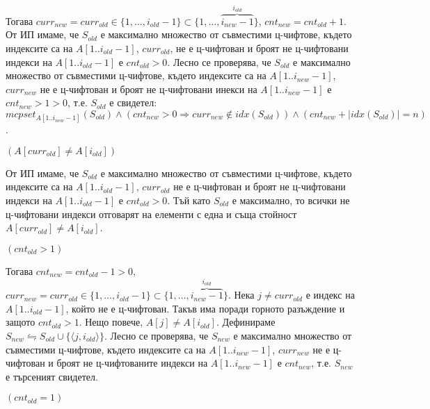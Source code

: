 \begin{solution}
\begin{maintenance}
\begin{mycase}
			\vspace{-0.35cm}
			Тогава $curr_{new}=curr_{old}\in\{1,\dots,i_{old}-1\}\subset\{1,\dots,\overbrace{i_{new}-1}^{i_{old}}\}$, $cnt_{new}=cnt_{old}+1$. От ИП имаме, че $S_{old}$ е максимално множество от съвместими ц-чифтове, където индексите са на $A[1..i_{old}-1]$, $curr_{old}$, не е ц-чифтован и броят не ц-чифтовани индекси на $A[1..i_{old}-1]$ е $cnt_{old}>0$. Лесно се проверява, че $S_{old}$ е максимално множество от съвместими ц-чифтове, където индексите са на $A[1..i_{new}-1]$, $curr_{new}$ не е ц-чифтован и броят не ц-чифтовани инекси на $A[1..i_{new}-1]$ е $cnt_{new}>1>0$, т.е. $S_{old}$ е свидетел: $mcpset_{A[1..i_{new}-1]}(S_{old})\land(cnt_{new}>0\Rightarrow curr_{new}\notin idx(S_{old}))\land(cnt_{new}+|idx(S_{old})|=n)$.
			
			\item $(A[curr_{old}]\ne A[i_{old}])$
			
			От ИП имаме, че $S_{old}$ е максимално множество от съвместими ц-чифтове, където индексите са на $A[1..i_{old}-1]$, $curr_{old}$ не е ц-чифтован и броят не ц-чифтовани индекси на $A[1..i_{old}-1]$ е $cnt_{old}>0$. Тъй като $S_{old}$ е максимално, то всички не ц-чифтовани индекси отговарят на елементи с една и съща стойност $A[curr_{old}]\ne A[i_{old}]$.
			\begin{mycase}
				\item $(cnt_{old}>1)$
				
				\vspace{-0.35cm}
				Тогава $cnt_{new}=cnt_{old}-1>0$, $curr_{new}=curr_{old}\in\{1,\dots,i_{old}-1\}\subset\{1,\dots,\overbrace{i_{new}-1}^{i_{old}}\}$. Нека $j\ne curr_{old}$ е индекс на $A[1..i_{old}-1]$, който не е ц-чифтован. Такъв има поради горното разъждение и защото $cnt_{old}>1$. Нещо повече, $A[j]\ne A[i_{old}]$. Дефинираме $S_{new}\leftrightharpoons S_{old}\cup\{\langle j,i_{old}\rangle\}$. Лесно се проверява, че $S_{new}$ е максимално множество от съвместими ц-чифтове, където индексите са на $A[1..i_{new}-1]$, $curr_{new}$ не е ц-чифтован и броят не ц-чифтованите индекси на $A[1..i_{new}-1]$ е $cnt_{new}$, т.е. $S_{new}$ е търсеният свидетел.
				
				\item $(cnt_{old}=1)$
				

\end{mycase}
\end{mycase}
\end{maintenance}
\end{solution}
